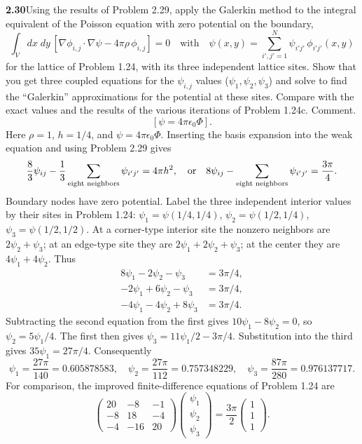 \par\bigskip
\noindent\textbf{2.30}\quad Using the results of Problem 2.29, apply the Galerkin method to the integral equivalent of the Poisson equation with zero potential on the boundary,
\[
\int_{V}dx\;dy\,[\nabla\phi_{i,j}\cdot\nabla\psi - 4\pi\rho\,\phi_{i,j}] = 0
\quad\text{with}\quad
\psi(x,y) = \sum_{i',j'=1}^{N}\psi_{i'j'}\,\phi_{i'j'}(x,y)
\]
for the lattice of Problem 1.24, with its three independent lattice sites. Show that you get three coupled equations for the $\psi_{i,j}$ values ($\psi_{1},\psi_{2},\psi_{3}$) and solve to find the ``Galerkin'' approximations for the potential at these sites. Compare with the exact values and the results of the various iterations of Problem 1.24c. Comment.
\[
[\psi = 4\pi\epsilon_{0}\Phi].
\]
\solution
Here $\rho=1$, $h=1/4$, and $\psi=4\pi\epsilon _0\Phi$.
Inserting the basis expansion into the weak equation and using
Problem 2.29 gives
\[
\frac83\psi_{ij}-\frac13\sum_{\text{eight neighbors}}\psi_{i'j'}
=4\pi h^2,
\quad\hbox{or}\quad
8\psi_{ij}-\sum_{\text{eight neighbors}}\psi_{i'j'}=\frac{3\pi}{4}.
\]
Boundary nodes have zero potential. Label the three independent
interior values by their sites in Problem 1.24:
$\psi_1=\psi(1/4,1/4)$,
$\psi_2=\psi(1/2,1/4)$,
$\psi_3=\psi(1/2,1/2)$.
At a corner-type interior site the nonzero neighbors are
$2\psi_2+\psi_3$; at an edge-type site they are
$2\psi_1+2\psi_2+\psi_3$; at the center they are
$4\psi_1+4\psi_2$. Thus
\[
\boxed{\begin{aligned}
8\psi_1-2\psi_2-\psi_3&=3\pi/4,\\
-2\psi_1+6\psi_2-\psi_3&=3\pi/4,\\
-4\psi_1-4\psi_2+8\psi_3&=3\pi/4.
\end{aligned}}
\]
Subtracting the second equation from the first gives
$10\psi_1-8\psi_2=0$, so $\psi_2=5\psi_1/4$.
The first then gives $\psi_3=11\psi_1/2-3\pi/4$.
Substitution into the third gives
$35\psi_1=27\pi/4$. Consequently
\[
\boxed{\psi_1=\frac{27\pi}{140}=0.605878583,\quad
       \psi_2=\frac{27\pi}{112}=0.757348229,\quad
       \psi_3=\frac{87\pi}{280}=0.976137717.}
\]
For comparison, the improved finite-difference equations of
Problem 1.24 are
\[
\begin{pmatrix}20&-8&-1\\-8&18&-4\\-4&-16&20\end{pmatrix}
\begin{pmatrix}\psi_1\\\psi_2\\\psi_3\end{pmatrix}
=\frac{3\pi}{2}\begin{pmatrix}1\\1\\1\end{pmatrix}.
\]
